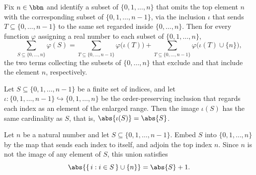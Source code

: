 \begin{lemma}
\label{BooleanAnalysis.Hypercontractivity.finset_fin_succ_sum_partition}
\leanok
{}
Fix $n \in \bbn$ and identify a subset of $\{0, 1, \dots, n\}$ that omits the top
element $n$ with the corresponding subset of $\{0, 1, \dots, n-1\}$, via the inclusion
$\iota$ that sends $T \subseteq \{0,\dots,n-1\}$ to the same set regarded inside
$\{0,\dots,n\}$. Then for every function $\varphi$ assigning a real number to each
subset of $\{0, 1, \dots, n\}$,
\[
  \sum_{S \subseteq \{0,\dots,n\}} \varphi(S)
  = \sum_{T \subseteq \{0,\dots,n-1\}} \varphi\bigl(\iota(T)\bigr)
  + \sum_{T \subseteq \{0,\dots,n-1\}} \varphi\bigl(\iota(T) \cup \{n\}\bigr),
\]
the two terms collecting the subsets of $\{0,\dots,n\}$ that exclude and that include
the element $n$, respectively.
\end{lemma}

\begin{lemma}
\label{BooleanAnalysis.Hypercontractivity.card_image_castSucc}
\leanok
{}
Let $S \subseteq \{0, 1, \dots, n-1\}$ be a finite set of indices, and let $\iota \colon
\{0, 1, \dots, n-1\} \hookrightarrow \{0, 1, \dots, n\}$ be the order-preserving
inclusion that regards each index as an element of the enlarged range. Then the image
$\iota(S)$ has the same cardinality as $S$, that is, $\abs{\iota(S)} = \abs{S}$.
\end{lemma}

\begin{lemma}
\label{BooleanAnalysis.Hypercontractivity.card_image_castSucc_union_last}
\leanok
{}
Let $n$ be a natural number and let $S \subseteq \{0, 1, \dots, n-1\}$. Embed $S$ into
$\{0, 1, \dots, n\}$ by the map that sends each index to itself, and adjoin the top
index $n$. Since $n$ is not the image of any element of $S$, this union satisfies
\[
\abs{\{\, i : i \in S \,\} \cup \{n\}} = \abs{S} + 1.
\]
\end{lemma}

